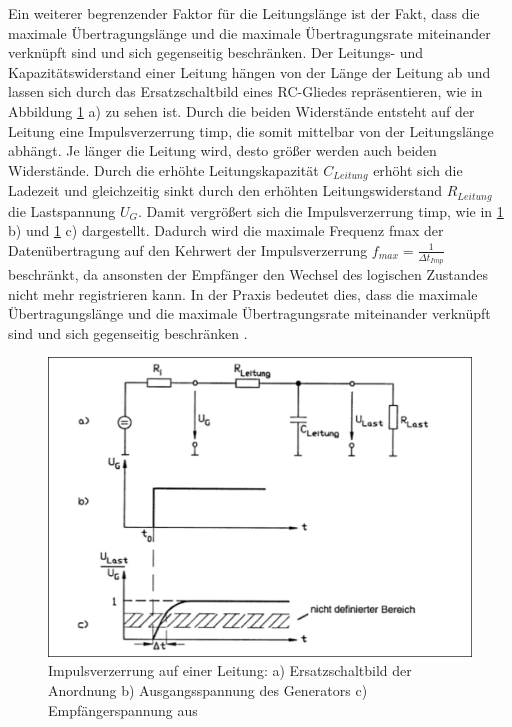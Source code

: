 Ein weiterer begrenzender Faktor für die Leitungslänge ist der Fakt, dass die maximale Übertragungslänge und die maximale Übertragungsrate miteinander verknüpft sind und sich gegenseitig beschränken.
Der Leitungs- und Kapazitätswiderstand einer Leitung hängen von der Länge der Leitung ab und lassen sich durch das Ersatzschaltbild eines RC-Gliedes repräsentieren, wie in Abbildung \ref{fig:bus_impuls} a) zu sehen ist. Durch die beiden Widerstände entsteht auf der Leitung eine Impulsverzerrung \gls{timp}, die somit mittelbar von der Leitungslänge abhängt.
Je länger die Leitung wird, desto größer werden auch beiden Widerstände. Durch die erhöhte Leitungskapazität $C_{Leitung}$ erhöht sich die Ladezeit und gleichzeitig sinkt durch den erhöhten Leitungswiderstand $R_{Leitung}$ die Lastspannung $U_{G}$. Damit vergrößert sich die Impulsverzerrung \gls{timp}, wie in \ref{fig:bus_impuls} b) und \ref{fig:bus_impuls} c) dargestellt.
Dadurch wird die maximale Frequenz \gls{fmax} der Datenübertragung auf den Kehrwert der Impulsverzerrung $f_{max}=\frac{1}{\Delta t_{Imp}}$ beschränkt, da ansonsten der Empfänger den Wechsel des logischen Zustandes nicht mehr registrieren kann. In der Praxis bedeutet dies, dass die maximale Übertragungslänge und die maximale Übertragungsrate miteinander verknüpft sind und sich gegenseitig beschränken \cite[S.~4f.]{schn06}.

\begin{figure}
\centering
\includegraphics[width=\textwidth]{abbildungen/20160110_impulsbus}
\caption[Impulsverzerrung auf einer Leitung]{Impulsverzerrung auf einer Leitung: a) Ersatzschaltbild der Anordnung b) Ausgangsspannung des Generators c) Empfängerspannung aus \cite[S.~4]{schn06}}
\label{fig:bus_impuls}
\end{figure}

